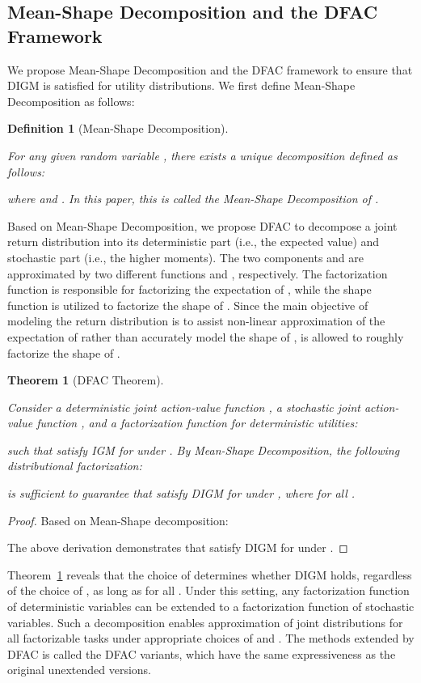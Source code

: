 \documentclass[twoside,11pt]{article}
\newcommand{\digm}{DIGM}
\newcounter{theorem0}
\newcounter{definition0}
\newtheorem{theorem}[theorem0]{Theorem}
\newtheorem{definition}[definition0]{Definition}
\begin{document}
\subsection{Mean-Shape Decomposition and the DFAC Framework}
\label{subsec:methodology_the_proposed_dfac_framework}

We propose Mean-Shape Decomposition and the DFAC framework to ensure that \digm{} is satisfied for utility distributions. We first define Mean-Shape Decomposition as follows:
\begin{definition}[Mean-Shape Decomposition]
\label{def:mean_shape_decomposition}

For any given random variable , there exists a unique decomposition defined as follows:

where  and . In this paper, this is called the Mean-Shape Decomposition of .

\end{definition} Based on Mean-Shape Decomposition, we propose DFAC to decompose a joint return distribution  into its deterministic part  (i.e., the expected value) and stochastic part  (i.e., the higher moments). The two components  and  are approximated by two different functions  and , respectively. The factorization function  is responsible for factorizing the expectation of , while the shape function  is utilized to factorize the shape of . Since the main objective of modeling the return distribution is to assist non-linear approximation of the expectation of  \citep{Lyle2019Comparative,BDR2022} rather than accurately model the shape of ,  is allowed to roughly factorize the shape of .
\begin{theorem}[DFAC Theorem]
\label{thm:dfac}

Consider a deterministic joint action-value function , a stochastic joint action-value function , and a factorization function  for deterministic utilities:

such that  satisfy IGM for  under . By Mean-Shape Decomposition, the following distributional factorization:

is sufficient to guarantee that  satisfy \digm{} for  under , where  for all .
\end{theorem}
\begin{proof}
Based on Mean-Shape decomposition:

The above derivation demonstrates that  satisfy \digm{} for  under .
\end{proof} Theorem~\ref{thm:dfac} reveals that the choice of  determines whether DIGM holds, regardless of the choice of , as long as  for all . Under this setting, any factorization function of deterministic variables can be extended to a factorization function of stochastic variables. Such a decomposition enables approximation of joint distributions for all factorizable tasks under appropriate choices of  and . The methods extended by DFAC is called the DFAC variants, which have the same expressiveness as the original unextended versions.
\end{document}

